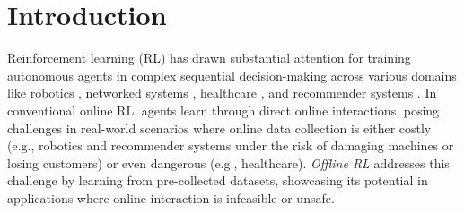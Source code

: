 \section{Introduction}

Reinforcement learning (RL) has drawn substantial attention for training autonomous agents in complex sequential decision-making across various domains like robotics \cite{kalashnikov2018scalable, ibarz2021train}, networked systems \cite{chu2020multi, qu2020scalable}, healthcare \cite{yu2021reinforcement, yom2017encouraging}, and recommender systems \cite{afsar2022reinforcement, zhao2021dear}. In conventional online RL, agents learn through direct online interactions, posing challenges in real-world scenarios where online data collection is either costly (e.g., robotics and recommender systems under the risk of damaging machines or losing customers) or even dangerous (e.g., healthcare). \textit{Offline RL} addresses this challenge by learning from pre-collected datasets, showcasing its potential in applications where online interaction is infeasible or unsafe.

